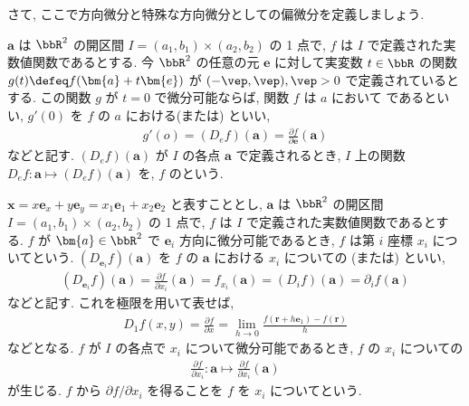 \documentclass[openany, a4paper, oneside]{jsbook}
\begin{document}
さて, ここで方向微分と特殊な方向微分としての偏微分を定義しましょう.
\begin{defn}
 $\bm{a}$ は $\bbR^2$ の開区間 $I=(a_1,b_1)\times (a_2,b_2)$ の 1 点で,
 $f$ は $I$ で定義された実数値関数であるとする.
今 $\bbR^2$ の任意の元 $\bm{e}$ に対して実変数 $t\in\bbR$ の関数
 $g (t)\defeq f (\bm{a}+t\bm{e})$ が $(-\vep,\vep),\vep>0$ で定義されているとする.
この関数 $g$ が $t=0$ で微分可能ならば, 関数 $f$ は $a$ において
であるといい,  $g'(0)$ を $f$ の
 $a$ における(または) といい,
    \begin{align}
        g'(o)
        =
        (D_ef) (\bm{a})
        =
        \frac{\partial f} {\partial \bm{e}}(\bm{a})
    \end{align}
などと記す.  $(D_ef) (\bm{a})$ が $I$ の各点 $\bm{a}$ で定義されるとき,  $I$ 上の関数
 $D_ef:\bm{a}\mapsto (D_ef) (\bm{a})$ を,  $f$ のという.
\end{defn}
\begin{defn}
 $\bm{x}=x\bm{e}_x+y\bm{e}_y=x_1\bm{e}_1+x_2\bm{e}_2$ と表すこととし,
 $\bm{a}$ は $\bbR^2$ の開区間 $I=(a_1,b_1)\times (a_2,b_2)$ の 1 点で,
 $f$ は $I$ で定義された実数値関数であるとする.
 $f$ が $\bm{a}\in\bbR^2$ で $\bm{e}_i$ 方向に微分可能であるとき,
 $f$ は第 $i$ 座標 $x_i$ についてという.
 $(D_{\bm{e}_i}f) (\bm{a})$ を $f$ の $\bm{a}$ における $x_i$ についての
(または) といい,
\begin{align}
 (D_{\bm{e}_i}f) (\bm{a})
 =
 \frac{\partial f} {\partial x_i}(\bm{a})
 =
 f_{x_i}(\bm{a})
 =
 (D_if) (\bm{a})
 =
 \partial _i f (\bm{a})
\end{align}
などと記す.
これを極限を用いて表せば,
\begin{align}
 D_1f (x,y)
 =
 \frac{\partial f} {\partial x}
 =
 \lim_{h\to 0}\frac{f ( \bm{r} + h \bm{e}_1 ) - f (\bm{r}) } {h}
\end{align}
などとなる.
$f$ が $I$ の各点で $x_i$ について微分可能であるとき, $f$ の $x_i$ についての
\begin{align}
 \frac{\partial f}{\partial x_i}:\bm{a} \mapsto \frac{\partial f}{\partial x_i}(\bm{a})
\end{align}
が生じる.  $f$ から $\partial f/ \partial x_i$ を得ることを $f$ を $x_i$ についてという.
\end{defn}
\end{document}
